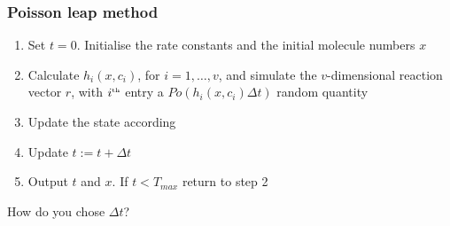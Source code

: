 \documentclass[t,compress]{beamer}
\begin{document}
\begin{frame}
\frametitle{Poisson leap method}
\begin{enumerate}
\item Set $t=0$. Initialise the rate constants and the initial molecule numbers $x$
\item Calculate $h_i(x,c_i)$, for $i=1,\ldots,v$, and simulate the
$v$-dimensional reaction vector $r$, with $i^{\text{{\tiny th}}}$ entry a
$Po(h_i(x,c_i)\Delta t)$ random quantity
\item Update the state according 
\item Update $t:=t+\Delta t$
\item Output $t$ and $x$. If $t<T_{max}$ return to step 2
\end{enumerate}
\pause
\begin{center}
{\Large {\color{red}How do you chose $\Delta t$?}}
\end{center}
\end{frame}
\end{document}
